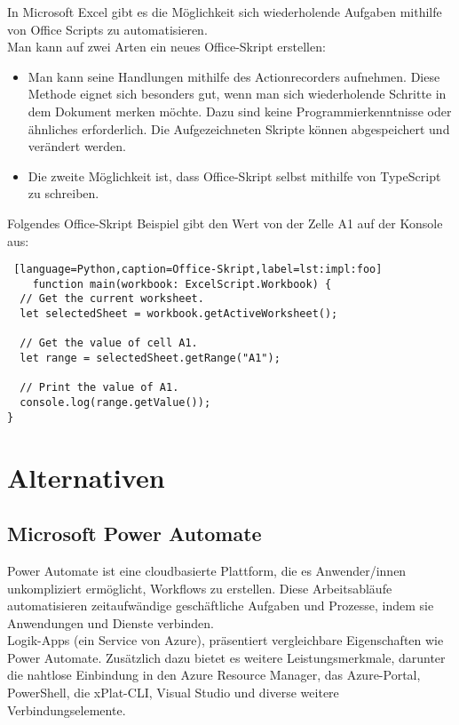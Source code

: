 In Microsoft Excel gibt es die Möglichkeit sich wiederholende Aufgaben mithilfe 
von Office Scripts zu automatisieren.
\\
Man kann auf zwei Arten ein neues Office-Skript erstellen:
\begin{itemize}
    \item Man kann seine Handlungen mithilfe des Actionrecorders aufnehmen. 
    Diese Methode eignet sich besonders gut, wenn man sich wiederholende 
    Schritte in dem Dokument merken möchte. Dazu sind keine Programmierkenntnisse 
    oder ähnliches erforderlich. Die Aufgezeichneten Skripte können 
    abgespeichert und verändert werden.
    \item Die zweite Möglichkeit ist, dass Office-Skript selbst mithilfe 
    von TypeScript zu schreiben.
\end{itemize}

Folgendes Office-Skript Beispiel gibt den Wert von der Zelle A1 auf der Konsole aus:

\begin{lstlisting} [language=Python,caption=Office-Skript,label=lst:impl:foo]
    function main(workbook: ExcelScript.Workbook) {
  // Get the current worksheet.
  let selectedSheet = workbook.getActiveWorksheet();

  // Get the value of cell A1.
  let range = selectedSheet.getRange("A1");
  
  // Print the value of A1.
  console.log(range.getValue());
}
\end{lstlisting}

\newpage

\section{Alternativen}

\subsection*{Microsoft Power Automate}

Power Automate ist eine cloudbasierte Plattform, die es Anwender/innen unkompliziert ermöglicht, 
Workflows zu erstellen. Diese Arbeitsabläufe automatisieren zeitaufwändige 
geschäftliche Aufgaben und Prozesse, indem sie Anwendungen und Dienste verbinden.\\

Logik-Apps (ein Service von Azure), 
präsentiert vergleichbare Eigenschaften wie Power Automate. Zusätzlich dazu 
bietet es weitere Leistungsmerkmale, darunter die nahtlose Einbindung in den 
Azure Resource Manager, das Azure-Portal, PowerShell, die xPlat-CLI, Visual Studio und 
diverse weitere Verbindungselemente.\\


